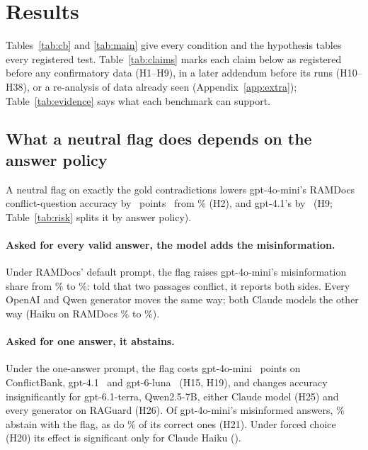 \section{Results}
\label{sec:results}

Tables~\ref{tab:cb} and \ref{tab:main} give every condition and the hypothesis tables every registered test.
Table~\ref{tab:claims} marks each claim below as registered before any confirmatory data (H1--H9), in a later addendum before its
runs (H10--H38), or a re-analysis of data already seen (Appendix~\ref{app:extra});
Table~\ref{tab:evidence} says what each benchmark can support.

\subsection{What a neutral flag does depends on the answer policy}
\label{sec:neutral}


A neutral flag on exactly the gold contradictions lowers gpt-4o-mini's RAMDocs conflict-question accuracy
by \adOracleFlagConf\ points \dOracleFlagConfCI\ from \plainConf\% (H2), and gpt-4.1's by \agptOracleFlagConf\ (H9; Table~\ref{tab:risk} splits it by answer policy).

\paragraph{Asked for every valid answer, the model adds the misinformation.} Under RAMDocs' default prompt,
the flag raises gpt-4o-mini's
misinformation share from \zmRdMiniPlainWrong\% to \zmRdMiniOracleFlagWrong\%: told that two
passages conflict, it reports both sides. Every OpenAI and Qwen generator moves the same way; both Claude models
the other way (Haiku on RAMDocs \zmRdHaikuPlainWrong\% to \zmRdHaikuOracleFlagWrong\%).

\paragraph{Asked for one answer, it abstains.} Under the one-answer prompt, the
flag costs gpt-4o-mini \azSgMiniOracleFlagConflict\ points on ConflictBank, gpt-4.1 \azSgFourOracleFlagConflict\ and
gpt-6-luna \azSgLunaOracleFlagConflict\ (H15, H19), and changes accuracy insignificantly for gpt-6.1-terra,
Qwen2.5-7B, either Claude model (H25) and every generator on RAGuard (H26). Of gpt-4o-mini's misinformed answers, \trSgMiniNeutralMisinfoAbstain\% abstain with the flag, as do
\trSgMiniNeutralCorrectAbstain\% of its correct ones (H21). Under forced choice (H20) its effect is significant only for Claude Haiku
(\hTwentyFcHaikuFlag).

